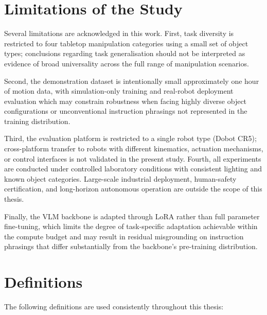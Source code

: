 \section{Limitations of the Study}


Several limitations are acknowledged in this work. First, task diversity is
restricted to four tabletop manipulation categories using a small set of object
types; conclusions regarding task generalisation should not be interpreted as
evidence of broad universality across the full range of manipulation scenarios.

Second, the demonstration dataset is intentionally small approximately one hour
of motion data, with simulation-only training and real-robot deployment evaluation 
which may constrain robustness when facing highly diverse object configurations or
unconventional instruction phrasings not represented in the training distribution.

Third, the evaluation platform is restricted to a single robot type (Dobot CR5);
cross-platform transfer to robots with different kinematics, actuation mechanisms,
or control interfaces is not validated in the present study. Fourth, all experiments
are conducted under controlled laboratory conditions with consistent lighting and
known object categories. Large-scale industrial deployment, human-safety
certification, and long-horizon autonomous operation are outside the scope of this
thesis.

Finally, the VLM backbone is adapted through LoRA rather than full parameter
fine-tuning, which limits the degree of task-specific adaptation achievable within
the compute budget and may result in residual misgrounding on instruction phrasings
that differ substantially from the backbone's pre-training distribution.



\section{Definitions}


\noindent The following definitions are used consistently throughout this thesis:

